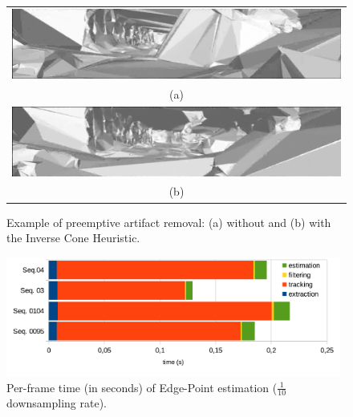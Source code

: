 \begin{figure}
\centering
\begin{tabular}{c}
\includegraphics[width=0.98\columnwidth]{./img//inverseConeWithout}\\
(a)\\
\includegraphics[width=0.98\columnwidth]{./img//inverseConeWith}\\
(b) 
\end{tabular}
\caption{Example of preemptive artifact removal: (a) without  and (b) with the Inverse Cone Heuristic.}
\label{fig:exampleArt}
\end{figure}


 \begin{figure}[t]
  \centering
  \includegraphics[width=0.98\textwidth]{././img//risultatitiming.pdf}
  \caption{Per-frame time (in seconds) of Edge-Point estimation ($\frac{1}{10}$ downsampling rate).}
   \label{tab:timing}
\end{figure}
%

  

